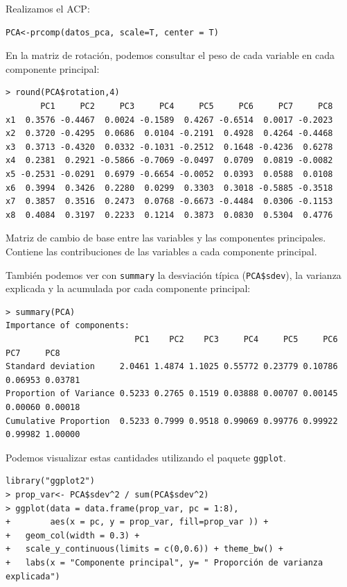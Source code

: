 \documentclass[12pt]{article}
\begin{document}
Realizamos el ACP:
\begin{verbatim}
PCA<-prcomp(datos_pca, scale=T, center = T)
\end{verbatim}
En la matriz de rotación, podemos consultar el peso de cada variable en cada componente principal:
\begin{table}[H]
  \centering
\begin{verbatim}
> round(PCA$rotation,4)
       PC1     PC2     PC3     PC4     PC5     PC6     PC7     PC8
x1  0.3576 -0.4467  0.0024 -0.1589  0.4267 -0.6514  0.0017 -0.2023
x2  0.3720 -0.4295  0.0686  0.0104 -0.2191  0.4928  0.4264 -0.4468
x3  0.3713 -0.4320  0.0332 -0.1031 -0.2512  0.1648 -0.4236  0.6278
x4  0.2381  0.2921 -0.5866 -0.7069 -0.0497  0.0709  0.0819 -0.0082
x5 -0.2531 -0.0291  0.6979 -0.6654 -0.0052  0.0393  0.0588  0.0108
x6  0.3994  0.3426  0.2280  0.0299  0.3303  0.3018 -0.5885 -0.3518
x7  0.3857  0.3516  0.2473  0.0768 -0.6673 -0.4484  0.0306 -0.1153
x8  0.4084  0.3197  0.2233  0.1214  0.3873  0.0830  0.5304  0.4776
\end{verbatim}
  \caption{Matriz de cambio de base entre las variables y las
    componentes principales. Contiene las contribuciones de las
    variables a cada componente principal.}
  \label{tab:mat-rot}
\end{table} \vspace{-5mm}
También podemos ver con \texttt{summary} la desviación típica
(\texttt{PCA\$sdev}), la varianza explicada y la acumulada por cada
componente principal:
\begin{verbatim}
> summary(PCA)
Importance of components:
                          PC1    PC2    PC3     PC4     PC5     PC6     PC7     PC8
Standard deviation     2.0461 1.4874 1.1025 0.55772 0.23779 0.10786 0.06953 0.03781
Proportion of Variance 0.5233 0.2765 0.1519 0.03888 0.00707 0.00145 0.00060 0.00018
Cumulative Proportion  0.5233 0.7999 0.9518 0.99069 0.99776 0.99922 0.99982 1.00000
\end{verbatim}

Podemos visualizar estas cantidades utilizando el paquete \texttt{ggplot}.
\begin{verbatim}
library("ggplot2")
> prop_var<- PCA$sdev^2 / sum(PCA$sdev^2)
> ggplot(data = data.frame(prop_var, pc = 1:8),
+        aes(x = pc, y = prop_var, fill=prop_var )) +
+   geom_col(width = 0.3) +
+   scale_y_continuous(limits = c(0,0.6)) + theme_bw() +
+   labs(x = "Componente principal", y= " Proporción de varianza explicada")
\end{verbatim}
\end{document}
